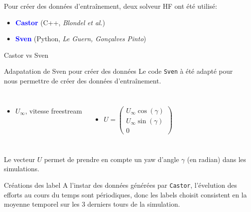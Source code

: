 \documentclass[
11pt,notheorems,hyperref={pdfauthor=whatever}
]{beamer}
\begin{document}
\begin{frame}

    \begin{center}
        Pour créer des données d'entraînement, deux solveur HF ont été utilisé: 
        \begin{itemize}
            \item \textcolor{blue}{\textbf{Castor}} (C++, \textit{Blondel et al.})
            \item \textcolor{blue}{\textbf{Sven}} (Python, \textit{Le Guern, Gonçalves Pinto})
        \end{itemize}        
    \end{center}
    
\end{frame}

\begin{frame}{Castor vs Sven}
    
\end{frame}

\begin{frame}{Adapatation de Sven pour créer des données}
    Le code \texttt{Sven} à été adapté pour nous permettre de créer des données d'entraînement. 


    \begin{columns}[c]
        \begin{itemize}\small
            \item $U_{\infty}$, vitesse freestream
        \end{itemize}

        
        \centering 

        \begin{itemize}\small
            \item $U = \begin{pmatrix}
                U_{\infty}\cos(\gamma)\\
                U_{\infty}\sin(\gamma)\\
                0
            \end{pmatrix}$
        \end{itemize}
    \end{columns}    
    
    \vspace{0.2cm}

    Le vecteur $U$ permet de prendre en compte un yaw d'angle $\gamma$ (en radian) dans les simulations.
\end{frame}

\begin{frame}{Créations des label}
    A l'instar des données générées par \texttt{Castor}, l'évelution des efforts au cours du temps sont périodiques, donc les labels choisit consistent en 
    la moyenne temporel sur les 3 derniers tours de la simulation.  
\end{frame}
\end{document}
